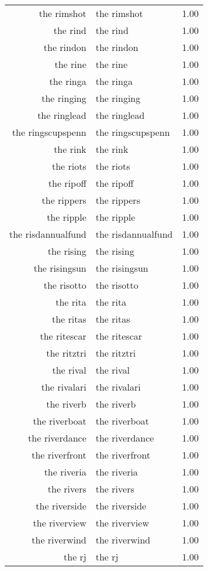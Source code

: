 \begin{table}[ht]
\begin{tabular}{rlr}
  the rimshot & the rimshot & 1.00 \\ 
  the rind & the rind & 1.00 \\ 
  the rindon & the rindon & 1.00 \\ 
  the rine & the rine & 1.00 \\ 
  the ringa & the ringa & 1.00 \\ 
  the ringing & the ringing & 1.00 \\ 
  the ringlead & the ringlead & 1.00 \\ 
  the ringscupspenn & the ringscupspenn & 1.00 \\ 
  the rink & the rink & 1.00 \\ 
  the riots & the riots & 1.00 \\ 
  the ripoff & the ripoff & 1.00 \\ 
  the rippers & the rippers & 1.00 \\ 
  the ripple & the ripple & 1.00 \\ 
  the risdannualfund & the risdannualfund & 1.00 \\ 
  the rising & the rising & 1.00 \\ 
  the risingsun & the risingsun & 1.00 \\ 
  the risotto & the risotto & 1.00 \\ 
  the rita & the rita & 1.00 \\ 
  the ritas & the ritas & 1.00 \\ 
  the ritescar & the ritescar & 1.00 \\ 
  the ritztri & the ritztri & 1.00 \\ 
  the rival & the rival & 1.00 \\ 
  the rivalari & the rivalari & 1.00 \\ 
  the riverb & the riverb & 1.00 \\ 
  the riverboat & the riverboat & 1.00 \\ 
  the riverdance & the riverdance & 1.00 \\ 
  the riverfront & the riverfront & 1.00 \\ 
  the riveria & the riveria & 1.00 \\ 
  the rivers & the rivers & 1.00 \\ 
  the riverside & the riverside & 1.00 \\ 
  the riverview & the riverview & 1.00 \\ 
  the riverwind & the riverwind & 1.00 \\ 
  the rj & the rj & 1.00 \\ 

\end{tabular}
\end{table}
